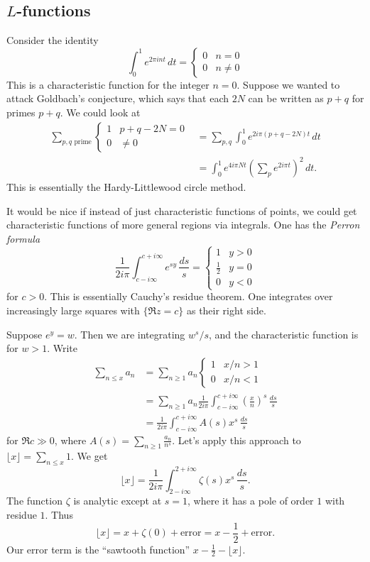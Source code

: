 \subsection{\texorpdfstring{$L$}{L}-functions}

\begin{example}
Consider the identity 
\[
  \int_0^1 e^{2\pi i n t}\, dt = \begin{cases} 0 & n=0 \\ 0 & n\ne 0\end{cases} 
\]
This is a characteristic function for the integer $n=0$. Suppose we wanted to 
attack Goldbach's conjecture, which says that each $2 N$ can be written as 
$p+q$ for primes $p+q$. We could look at 
\begin{align*}
  \sum_{p,q\text{ prime}} \begin{cases}1 & p+q-2 N = 0 \\ 0 & \ne 0\end{cases} 
    &= \sum_{p,q} \int_0^1 e^{2i\pi(p+q-2 N) t}\, dt \\
    &= \int_0^1 e^{4 i \pi N t}\left(\sum_p e^{2i \pi t}\right)^2\, dt .
\end{align*}
This is essentially the Hardy-Littlewood circle method. 
\end{example}

It would be nice if instead of just characteristic functions of points, we 
could get characteristic functions of more general regions via integrals. One 
has the \emph{Perron formula} 
\[
  \frac{1}{2i\pi} \int_{c-i\infty}^{c+i\infty} e^{s y}\, \frac{ds}{s} = \begin{cases} 1 & y>0 \\ \frac 1 2 & y=0 \\ 0 & y<0 \end{cases} 
\]
for $c>0$. This is essentially Cauchy's residue theorem. One integrates over 
increasingly large squares with $\{\Re z=c\}$ as their right side. 

Suppose $e^y=w$. Then we are integrating $w^s/s$, and the characteristic 
function is for $w>1$. Write 
\begin{align*}
  \sum_{n\leqslant x} a_n 
    &= \sum_{n\geqslant 1} a_n \begin{cases} 1 & x/n>1 \\ 0 & x/n<1 \end{cases} \\
    &= \sum_{n\geqslant 1} a_n \frac{1}{2i\pi} \int_{c-i\infty}^{c+i\infty} \left(\frac x n\right)^s\, \frac{ds}{s} \\
    &= \frac{1}{2i\pi} \int_{c-i\infty}^{c+i\infty} A(s) x^s\, \frac{ds}{s} 
\end{align*}
for $\Re c\gg 0$, where $A(s)=\sum_{n\geqslant 1} \frac{a_n}{n^s}$. 
Let's apply this approach to $\lfloor x\rfloor = \sum_{n\leqslant x} 1$. We get 
\[
  \lfloor x\rfloor = \frac{1}{2i\pi} \int_{2-i\infty}^{2+i\infty} \zeta(s) x^s\, \frac{ds}{s} .
\]
The function $\zeta$ is analytic except at $s=1$, where it has a pole of 
order $1$ with residue $1$. Thus 
\[
  \lfloor x\rfloor = x + \zeta(0) + \text{error} = x-\frac 1 2 + \text{error} .
\]
Our error term is the ``sawtooth function'' $x-\frac 1 2 - \lfloor x\rfloor$. 

